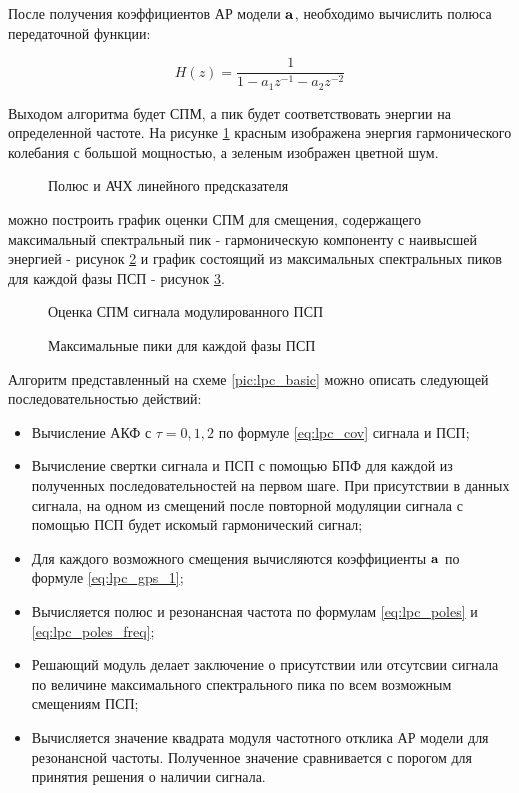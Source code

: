 После получения коэффициентов АР модели ${\bf{a}}$, необходимо вычислить полюса передаточной функции:
\begin{center}
\begin{equation}
	\label{eq:lpc_spectral_func}
	H(z) = \frac{1}{1 - a_1 z^{-1} - a_2 z^{-2}}
\end{equation}
\end{center}

Выходом алгоритма будет СПМ, а пик будет соответствовать энергии на определенной частоте. На рисунке
\ref{pic:lpc_poles_gps} красным изображена энергия гармонического колебания с большой мощностью, а
зеленым изображен цветной шум.
\begin{figure}[H]
	\center{}
	\caption{Полюс и АЧХ линейного предсказателя}
	\label{pic:lpc_poles_gps}
\end{figure}

можно построить график оценки СПМ для смещения,
содержащего максимальный спектральный пик - гармоническую компоненту
с наивысшей энергией - рисунок \ref{pic:lpc_psd_1} и график состоящий из максимальных спектральных пиков для каждой фазы
ПСП - рисунок \ref{pic:lpc_1sat_energy}.

\begin{figure}[H]
	\center{}
	\caption{Оценка СПМ сигнала модулированного ПСП}
	\label{pic:lpc_psd_1}
\end{figure}
\begin{figure}[H]
	\center{}
	\caption{Максимальные пики для каждой фазы ПСП}
	\label{pic:lpc_1sat_energy}
\end{figure}

Алгоритм представленный на схеме \ref{pic:lpc_basic} можно описать следующей последовательностью действий:
\begin{itemize}
	\item[Шаг 1] Вычисление АКФ с ${\tau = 0, 1, 2}$ по формуле \ref{eq:lpc_cov} сигнала и ПСП;
	\item[Шаг 2] Вычисление свертки сигнала и ПСП с помощью БПФ для каждой из полученных последовательностей
			на первом шаге. При присутствии в данных сигнала, на одном из смещений после
			повторной модуляции сигнала с помощью ПСП будет искомый гармонический сигнал;
	\item[Шаг 3.1] Для каждого возможного смещения вычисляются коэффициенты ${\bf{a}}$ по формуле
			\ref{eq:lpc_gps_1};
	\item[Шаг 3.2] Вычисляется полюс и резонансная частота по формулам \ref{eq:lpc_poles} и \ref{eq:lpc_poles_freq};
	\item[Шаг 4] Решающий модуль делает заключение о присутствии или отсутсвии сигнала по величине
			максимального спектрального пика по всем возможным смещениям ПСП;
	\item[Шаг 5] Вычисляется значение квадрата модуля частотного отклика АР модели для резонансной частоты.
			Полученное значение сравнивается с порогом для принятия решения о наличии сигнала.
\end{itemize}

